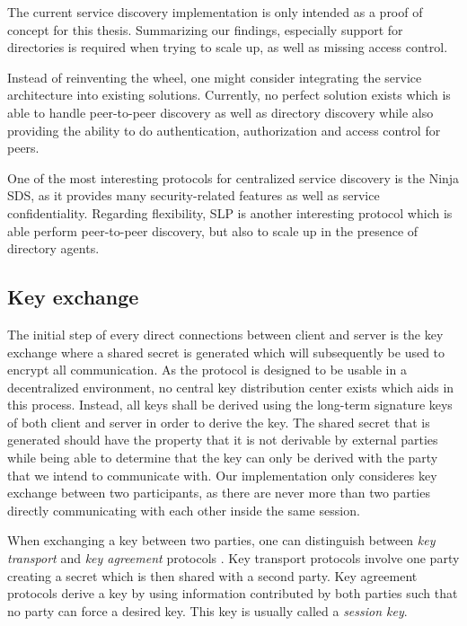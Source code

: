 \bigskip

The current service discovery implementation is only intended as a proof of concept for this thesis.
Summarizing our findings, especially support for directories is required when trying to scale up, as well as missing access control.

Instead of reinventing the wheel, one might consider integrating the service architecture into existing solutions.
Currently, no perfect solution exists which is able to handle peer-to-peer discovery as well as directory discovery while also providing the ability to do authentication, authorization and access control for peers.

One of the most interesting protocols for centralized service discovery is the Ninja SDS, as it provides many security-related features as well as service confidentiality.
Regarding flexibility, SLP is another interesting protocol which is able perform peer-to-peer discovery, but also to scale up in the presence of directory agents.

\subsection{Key exchange}

The initial step of every direct connections between client and server is the key exchange where a shared secret is generated which will subsequently be used to encrypt all communication.
As the protocol is designed to be usable in a decentralized environment, no central key distribution center exists which aids in this process.
Instead, all keys shall be derived using the long-term signature keys of both client and server in order to derive the key.
The shared secret that is generated should have the property that it is not derivable by external parties while being able to determine that the key can only be derived with the party that we intend to communicate with.
Our implementation only consideres key exchange between two participants, as there are never more than two parties directly communicating with each other inside the same session.

When exchanging a key between two parties, one can distinguish between \emph{key transport} and \emph{key agreement} protocols \cite{menezes1996handbook}.
Key transport protocols involve one party creating a secret which is then shared with a second party.
Key agreement protocols derive a key by using information contributed by both parties such that no party can force a desired key.
This key is usually called a \emph{session key}.

